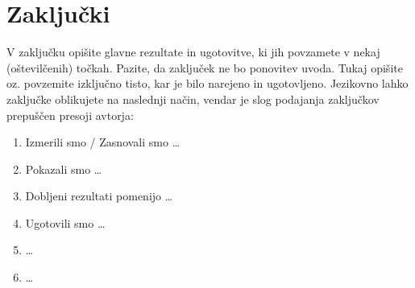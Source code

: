 \chapter{Zaključki}\label{cha:zakljucki}

V zaključku opišite glavne rezultate in ugotovitve, ki jih povzamete v nekaj (oštevilčenih) točkah. Pazite, da zaključek ne bo ponovitev uvoda. Tukaj opišite oz. povzemite izključno tisto, kar je bilo narejeno in ugotovljeno. Jezikovno lahko zaključke oblikujete na naslednji način, vendar je slog podajanja zaključkov prepuščen presoji avtorja:
\begin{enumerate}
\item Izmerili smo / Zasnovali smo \ldots
\item Pokazali smo \ldots
\item Dobljeni rezultati pomenijo \ldots
\item Ugotovili smo \ldots
\item \ldots
\item \ldots
\end{enumerate}

 